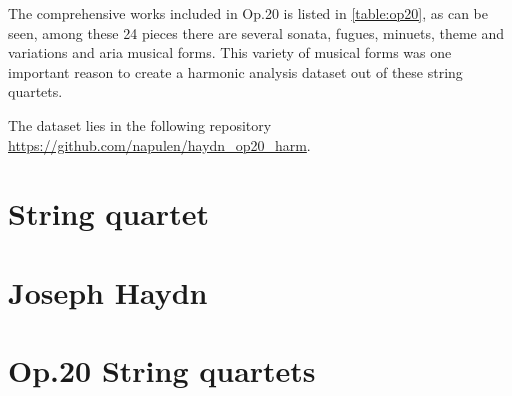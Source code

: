 The comprehensive works included in Op.20 is listed in \autoref{table:op20}, as can be seen, among these 24 pieces there are several sonata, fugues, minuets, theme and variations and aria musical forms. This variety of musical forms was one important reason to create a harmonic analysis dataset out of these string quartets.



The dataset lies in the following repository \url{https://github.com/napulen/haydn_op20_harm}.

\section{String quartet}

\section{Joseph Haydn}

\section{Op.20 String quartets}

\newpage
